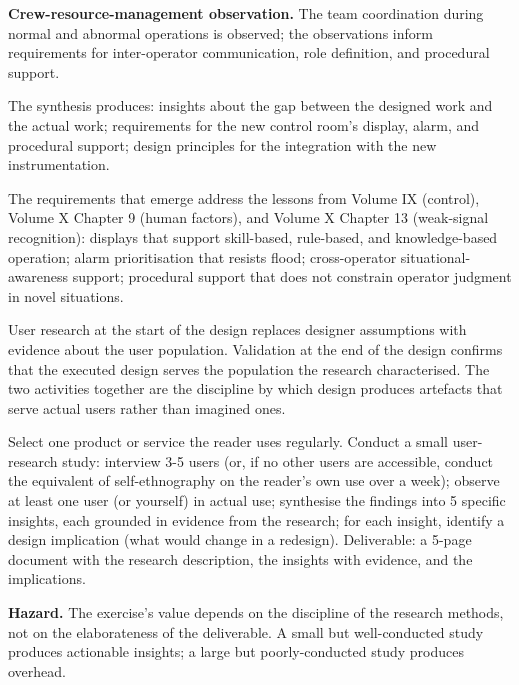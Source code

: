 \textbf{Crew-resource-management observation.} The team coordination during normal and abnormal operations is observed; the observations inform requirements for inter-operator communication, role definition, and procedural support.

The synthesis produces: insights about the gap between the designed work and the actual work; requirements for the new control room's display, alarm, and procedural support; design principles for the integration with the new instrumentation.

The requirements that emerge address the lessons from Volume IX (control), Volume X Chapter 9 (human factors), and Volume X Chapter 13 (weak-signal recognition): displays that support skill-based, rule-based, and knowledge-based operation; alarm prioritisation that resists flood; cross-operator situational-awareness support; procedural support that does not constrain operator judgment in novel situations.

\begin{principle}
User research at the start of the design replaces designer assumptions with evidence about the user population. Validation at the end of the design confirms that the executed design serves the population the research characterised. The two activities together are the discipline by which design produces artefacts that serve actual users rather than imagined ones.
\end{principle}

\begin{project}
Select one product or service the reader uses regularly. Conduct a small user-research study: interview 3-5 users (or, if no other users are accessible, conduct the equivalent of self-ethnography on the reader's own use over a week); observe at least one user (or yourself) in actual use; synthesise the findings into 5 specific insights, each grounded in evidence from the research; for each insight, identify a design implication (what would change in a redesign). Deliverable: a 5-page document with the research description, the insights with evidence, and the implications.

\textbf{Hazard.} The exercise's value depends on the discipline of the research methods, not on the elaborateness of the deliverable. A small but well-conducted study produces actionable insights; a large but poorly-conducted study produces overhead.
\end{project}

